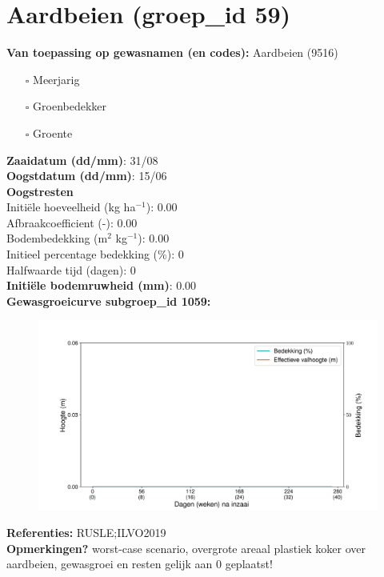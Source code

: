 \documentclass{article}
\begin{document}
 \section{Aardbeien (groep\_id 59)} 
 \textbf{Van toepassing op gewasnamen (en codes):} Aardbeien (9516) 
 \begin{multicols}{3} \begin{itemize} \item[$\square$] Meerjarig \item[$\square$] Groenbedekker \item[$\square$] Groente \end{itemize} \end{multicols} 
  \textbf{Zaaidatum (dd/mm)}: 31/08  \vspace{0.10cm} \\ 
  \textbf{Oogstdatum (dd/mm)}: 15/06  \vspace{0.10cm} \\ 
  \textbf{Oogstresten} \vspace{0.05cm} \\ 
  \tab Initi\"{e}le hoeveelheid (kg ha$^{-1}$): 0.00 \vspace{0.05cm} \\ 
  \tab Afbraakcoefficient (-): 0.00 \vspace{0.05cm} \\ 
  \tab Bodembedekking (m$^2$ kg$^{-1}$): 0.00 \vspace{0.05cm} \\ 
  \tab Initieel percentage bedekking (\%): 0 \vspace{0.05cm} \\ 
  \tab Halfwaarde tijd (dagen): 0 \vspace{0.05cm} \\ 
  \textbf{Initi\"{e}le bodemruwheid (mm)}: 0.00 \vspace{0.05cm} \\ 
  \textbf{Gewasgroeicurve subgroep\_id 1059:} 
 \begin{center} \begin{figure}[H] \includegraphics[width=12.5cm]{temp/1059.png} \end{figure} \end{center} 
  \textbf{Referenties:} RUSLE;ILVO2019 \vspace{0.10cm} \\ 
  \textbf{Opmerkingen?} worst-case scenario, overgrote areaal plastiek koker over aardbeien, gewasgroei en resten gelijk aan 0 geplaatst! \vspace{0.10cm} \\ 
 \newpage 
\end{document}
